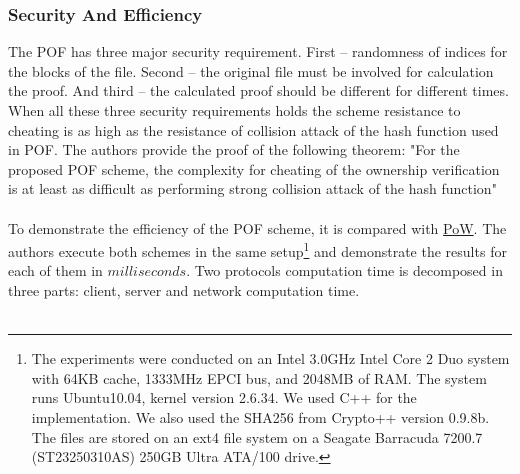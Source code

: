 \documentclass[12pt]{article}
\begin{document}
\subsubsection{Security And Efficiency}
\label{subsub:secAndeff3}


The POF has three major security requirement. First -- randomness of indices for the blocks of the file. Second -- the original file  must be involved for calculation the proof. And third -- the calculated proof should be different for different times. When all these three security requirements holds the scheme resistance to cheating is as high as the resistance of collision attack of the hash function used in POF. The authors provide the proof of the following theorem: "For the proposed POF scheme, the complexity for cheating of the ownership verification is at least as difficult as performing strong collision attack of the hash function"\\\\
To demonstrate the efficiency of the POF scheme, it is compared with \hyperref[sub:Soltuion1]{PoW}. The authors execute both schemes in the same setup\footnote{The experiments were conducted on an Intel 3.0GHz Intel Core 2 Duo system with 64KB cache, 1333MHz EPCI bus, and 2048MB of RAM. The system runs Ubuntu10.04, kernel version 2.6.34. We used C++ for the implementation. We also used the SHA256 from Crypto++ version 0.9.8b\cite{crypto}. The files are stored on an ext4 file system on a Seagate Barracuda 7200.7 (ST23250310AS) 250GB Ultra
ATA/100 drive.} and demonstrate the results for each of them in $milliseconds$. Two protocols computation time is decomposed in three parts: client, server and network computation time.\\\\ 
\end{document}
